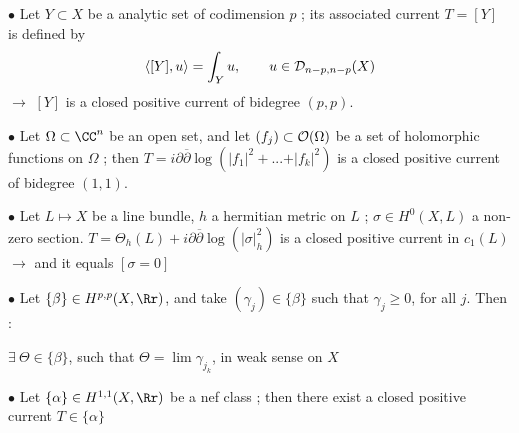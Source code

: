 \begin{slide}
\par\vspace{\bigskipamount}\noindent
\par\noindent
$\bullet$ Let $Y\subset X$ be a analytic set of codimension $p$ ;
its associated current $T=[Y]$ is defined by
$$
\langle[Y], u\rangle=\int_Y u,\qquad u\in {\cal D}_{n-p,n-p}(X)
$$
\hskip 0.5cm $\rightarrow$ $[Y]$ is a closed positive current of bidegree $(p,p)$.

\par\vspace{\bigskipamount}\noindent
$\bullet$ Let $\Omega\subset {\CC}^n$ be an open set, and let $(f_j)\subset {\cal O}(\Omega)$
 be a set of holomorphic functions on $\Omega$ ; then 
\vskip 3pt 
\hskip 1cm $T= i\partial\overline \partial\log(\vert f_1\vert ^2+ ...+\vert f_k\vert ^2)$ \hskip 1cm
is a closed positive current of bidegree $(1,1)$. 

\par\vspace{\bigskipamount}\noindent
$\bullet$ Let $L\mapsto X$ be a line bundle, $h$ a hermitian metric on $L$ ;  
$\sigma\in H^0(X, L)$ a non-zero section. 
\vskip 3pt
\hskip 1cm
$T= \Theta_h(L)+ i\partial\overline \partial\log(\vert \sigma\vert_h^2)$
\hskip 1cm
 is a closed positive current
in $c_1(L)$ 
\vskip 1pt 
\hskip 6cm $\rightarrow$ and it equals $[\sigma= 0]$

\par\vspace{\bigskipamount}\noindent
$\bullet$ 
Let $\{\beta \}\in H^{p,p}(X, {\Rr})$, and take $(\gamma_j)\in \{\beta \}$ such that
$\gamma_j\geq 0$, for all $j$. Then :
 \vskip 3pt
\centerline{ $\exists\ \Theta\in \{\beta \}$, such that 
$\Theta= \lim \gamma_{j_k}$, in weak sense on $X$} 

\par\vspace{\bigskipamount}\noindent
$\bullet$ Let $\{\alpha \}\in H^{1,1}(X, {\Rr})$ be a nef class ;
 then there exist
a closed positive current $T\in \{\alpha \}$ 
\end{slide}

